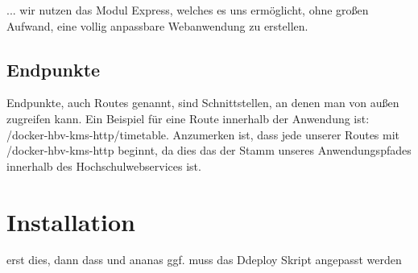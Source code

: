 ... wir nutzen das Modul Express, welches es uns ermöglicht, ohne großen Aufwand, eine vollig anpassbare Webanwendung zu erstellen.



\subsection{Endpunkte}
Endpunkte, auch Routes genannt, sind Schnittstellen, an denen man von außen zugreifen kann.
Ein Beispiel für eine Route innerhalb der Anwendung ist: /docker-hbv-kms-http/timetable.
Anzumerken ist, dass jede unserer Routes mit /docker-hbv-kms-http beginnt, da dies das
der Stamm unseres Anwendungspfades innerhalb des Hochschulwebservices ist.

\section{Installation}
erst dies, dann dass und ananas
ggf. muss das Ddeploy Skript angepasst werden
